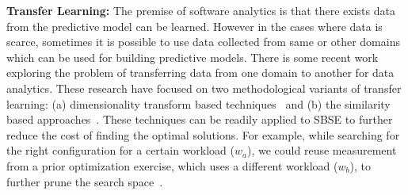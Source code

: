 \documentclass[sigconf,anonymous,review]{acmart}
\begin{document}
 \noindent\textbf{Transfer Learning: }The premise of software analytics is that there exists data
from the predictive model can be learned. However in the cases where data is scarce, sometimes it is possible to use data collected from same or other domains
which can be used for building predictive models. There is some recent work exploring the problem of transferring data from one domain to another for data analytics. These research have focused on two methodological variants of transfer learning: (a) dimensionality
transform based techniques~\cite{nam2013transfer, krishna2016too, nam2017heterogeneous,minku2014transfer}
and (b) the similarity based approaches~\cite{kocaguneli2011find, kocaguneli2015transfer, peters2015lace2}.
These techniques can be readily applied to SBSE to further reduce the cost of finding the optimal solutions. For example, while searching for the right configuration for a certain workload ($w_a$), we could reuse measurement from a prior optimization exercise, which uses a different workload ($w_b$), to further prune the search space~\cite{jamshidi2017transfer, jamshidi2017transfer, valov2017transferring}.
\end{document}
